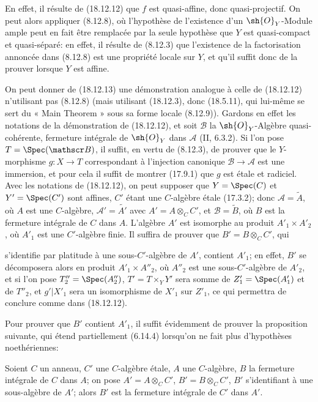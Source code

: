 En effet, il résulte de (18.12.12) que $f$ est quasi-affine, donc quasi-projectif. On peut alors appliquer (8.12.8), où l'hypothèse de l'existence d'un $\sh{O}_Y$-Module ample peut en fait être remplacée par la seule hypothèse que $Y$ est quasi-compact et quasi-séparé: en effet, il résulte de (8.12.3) que l'existence de la factorisation annoncée dans (8.12.8) est une propriété locale sur $Y$, et qu'il suffit donc de la prouver lorsque $Y$ est affine.

\begin{remark}[18.12.14]
\label{IV.18.12.14}
On peut donner de (18.12.13) une démonstration analogue à celle de (18.12.12) n'utilisant pas (8.12.8) (mais utilisant (18.12.3), donc (18.5.11), qui lui-même se sert du « Main Theorem » sous sa forme locale (8.12.9)). Gardons en effet les notations de la démonstration de (18.12.12), et soit $\mathscr B$ la $\sh{O}_Y$-Algèbre quasi-cohérente, fermeture intégrale de $\sh{O}_Y$ dans $\mathscr A$ (II, 6.3.2). Si l'on pose $T=\Spec(\mathscr B)$, il suffit, en vertu de (8.12.3), de prouver que le $Y$-morphisme $g:X\to T$ correspondant à l'injection canonique $\mathscr B\to\mathscr A$ est une immersion, et pour cela il suffit de montrer (17.9.1) que $g$ est étale et radiciel. Avec les notations de (18.12.12), on peut supposer que $Y=\Spec(C)$ et $Y'=\Spec(C')$ sont affines, $C'$ étant une $C$-algèbre étale (17.3.2); donc $\mathscr A=\widetilde A$, où $A$ est une $C$-algèbre, $\mathscr A'=\widetilde{A'}$ avec $A'=A\otimes_C C'$, et $\mathscr B=\widetilde B$, où $B$ est la fermeture intégrale de $C$ dans $A$. L'algèbre $A'$ est isomorphe au produit $A'_1\times A'_2$, où $A'_1$ est une $C'$-algèbre finie. Il suffira de prouver que $B'=B\otimes_C C'$, qui


s'identifie par platitude à une sous-$C'$-algèbre de $A'$, contient $A'_1$; en effet, $B'$ se décomposera alors en produit $A'_1\times A''_2$, où $A''_2$ est une sous-$C'$-algèbre de $A'_2$, et si l'on pose $T''_2=\Spec(A''_2)$, $T'=T\times_Y Y'$ sera somme de $Z'_1=\Spec(A'_1)$ et de $T''_2$, et $g'|X'_1$ sera un isomorphisme de $X'_1$ sur $Z'_1$, ce qui permettra de conclure comme dans (18.12.12).

Pour prouver que $B'$ contient $A'_1$, il suffit évidemment de prouver la proposition suivante, qui étend partiellement (6.14.4) lorsqu'on ne fait plus d'hypothèses noethériennes:
\end{remark}

\begin{proposition}[18.12.15]
\label{IV.18.12.15}
Soient $C$ un anneau, $C'$ une $C$-algèbre étale, $A$ une $C$-algèbre, $B$ la fermeture intégrale de $C$ dans $A$; on pose $A'=A\otimes_C C'$, $B'=B\otimes_C C'$, $B'$ s'identifiant à une sous-algèbre de $A'$; alors $B'$ est la fermeture intégrale de $C'$ dans $A'$.
\end{proposition}

